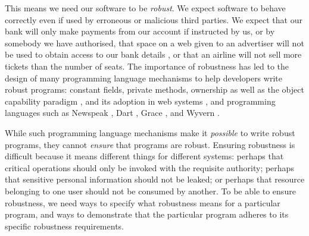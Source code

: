 \documentclass[acmsmall,screen]{acmart}
\begin{document}
This means we need our software to be \emph{robust}.
We expect software to behave correctly even if  used 
by erroneous or malicious third parties.
 We expect that our bank will only make payments 
from our account if instructed by us, or by somebody we have authorised, 
that space on a web given to an advertiser will not be used
to obtain access to our bank details \cite{cwe}, or that an
airline will not sell more tickets than the number of seats.
The importance of robustness has led to the design of many programming
language mechanisms to help developers write robust programs:
constant fields, private methods, ownership \cite{ownalias}
as well as the object capability paradigm \cite{MillerPhD},
and its adoption in  web systems
\cite{CapJavaHayesAPLAS17,CapNetSocc17Eide,DOCaT14}, and programming languages such as Newspeak
\cite{newspeak17}, Dart \cite{dart15},
Grace \cite{grace,graceClasses}, and Wyvern \cite{wyverncapabilities}.

While such programming language mechanisms make it \textit{possible} to write robust
programs, they cannot \textit{ensure} that programs are robust.
Ensuring robustness is difficult because it means 
different things for different systems: perhaps
that critical operations should only be invoked with the requisite authority;
perhaps that sensitive personal information should not be leaked; 
or perhaps that resource belonging to one user should not be consumed by another.
%
To be able to ensure robustness, we need ways to specify what robustness means for a 
particular program, and ways to demonstrate that the particular program 
adheres to its specific robustness requirements.
\end{document}

